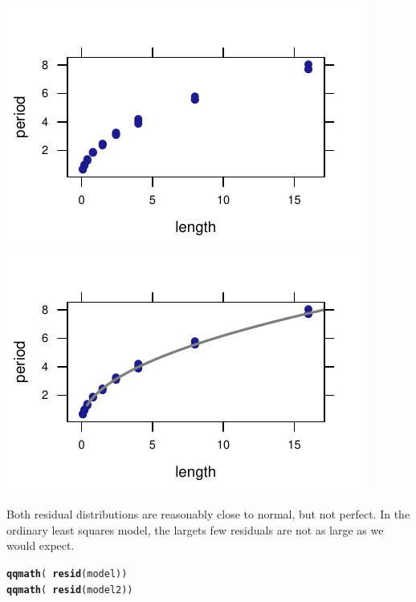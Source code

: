 \documentclass[twoside]{book}\usepackage[]{graphicx}\usepackage[]{xcolor}
\makeatletter
\def\maxwidth{ %
  \ifdim\Gin@nat@width>\linewidth
    \linewidth
  \else
    \Gin@nat@width
  \fi
}
\newcommand{\hlopt}[1]{\textcolor[rgb]{0,0,0}{#1}}%
\newcommand{\hlstd}[1]{\textcolor[rgb]{0.345,0.345,0.345}{#1}}%
\newcommand{\hlkwd}[1]{\textcolor[rgb]{0.737,0.353,0.396}{\textbf{#1}}}%
\newenvironment{kframe}{%
 \def\at@end@of@kframe{}%
 \ifinner\ifhmode%
  \def\at@end@of@kframe{\end{minipage}}%
  \begin{minipage}{\columnwidth}%
 \fi\fi%
 \def\FrameCommand##1{\hskip\@totalleftmargin \hskip-\fboxsep
 \colorbox{shadecolor}{##1}\hskip-\fboxsep
     \hskip-\linewidth \hskip-\@totalleftmargin \hskip\columnwidth}%
 \MakeFramed {\advance\hsize-\width
   \@totalleftmargin\z@ \linewidth\hsize
   \@setminipage}}%
 {\par\unskip\endMakeFramed%
 \at@end@of@kframe}
\newenvironment{knitrout}{}{} %
\makeatother
\begin{document}
\begin{solution}
\begin{knitrout}
{\centering \includegraphics[width=\maxwidth]{figures/fig-unnamed-chunk-211-1} 
\includegraphics[width=\maxwidth]{figures/fig-unnamed-chunk-211-2} 

}



\end{knitrout}
	Both residual distributions are reasonably close to normal, but not perfect.
	In the ordinary least squares model, the largets few residuals are not as large
	as we would expect.
\begin{knitrout}
\color{fgcolor}\begin{kframe}
\begin{alltt}
\hlkwd{qqmath}\hlstd{(}\hlopt{~}\hlkwd{resid}\hlstd{(model))}
\hlkwd{qqmath}\hlstd{(}\hlopt{~}\hlkwd{resid}\hlstd{(model2))}
\end{alltt}
\end{kframe}


\end{knitrout}
\end{solution}
\end{document}
